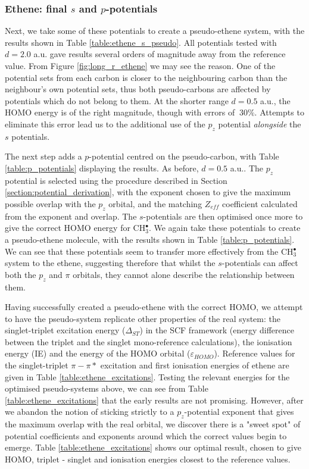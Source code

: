 \documentclass[12pt]{article}
\begin{document}
\subsubsection*{\sffamily \large Ethene: final \(s\) and \(p\)-potentials}

Next, we take some of these potentials to create a pseudo-ethene system, with the results shown in Table \ref{table:ethene_s_pseudo}.
All potentials tested with \(d = 2.0\) a.u. gave results several orders of magnitude away from the reference value.
From Figure \ref{fig:long_r_ethene} we may see the reason. One of the potential sets from each carbon is closer
to the neighbouring carbon than the neighbour's own potential sets, thus both pseudo-carbons are affected
by potentials which do not belong to them.
At the shorter range \(d = 0.5\) a.u., the HOMO energy is of the right magnitude, though with errors of \(~ 30\%\).
Attempts to eliminate this error lead us to the additional use of the \(p_{z}\) potential \textit{alongside} the \(s\) potentials.

The next step adds a \(p\)-potential centred on the pseudo-carbon, with Table \ref{table:p_potentials} displaying the results.
As before, \(d = 0.5\) a.u.. The \(p_{z}\) potential is selected using the procedure described in Section \ref{section:potential_derivation},
with the exponent chosen to give the maximum possible overlap with the \(p_{z}\) orbital,
and the matching \(Z_{eff}\) coefficient calculated from the exponent and overlap.
The \(s\)-potentials are then optimised once more to give the correct HOMO energy for CH\(^{\bullet}_{3}\).
We again take these potentials to create a pseudo-ethene molecule, with the results shown in Table \ref{table:p_potentials}.
We can see that these potentials seem to transfer more effectively from the CH\(^{\bullet}_{3}\) system to the ethene,
suggesting therefore that whilst the \(s\)-potentials can affect both the \(p_{z}\) and \(\pi\) orbitals, they 
cannot alone describe the relationship between them.

Having successfully created a pseudo-ethene with the correct HOMO, we attempt to have the pseudo-system replicate other properties of the real system:
the singlet-triplet excitation energy ($\Delta_{ST}$) in the SCF framework (energy difference between the triplet and the singlet mono-reference
calculations), the ionisation energy (IE) and the energy of the HOMO orbital ($\varepsilon_{HOMO}$). Reference values for the singlet-triplet \(\pi-\pi*\) excitation and first ionisation energies of ethene are given in Table \ref{table:ethene_excitations}. Testing the relevant energies for the optimised pseudo-systems above, we can see from Table \ref{table:ethene_excitations} that the early results are not promising. However, after we abandon the notion of sticking strictly to a \(p_{z}\)-potential exponent that gives the maximum overlap with the real orbital, we discover there is a "sweet spot" of potential coefficients and exponents around which the correct values begin to emerge. Table \ref{table:ethene_excitations} shows our optimal result, chosen to give HOMO, triplet - singlet and ionisation energies closest to the reference values. 
\end{document}
